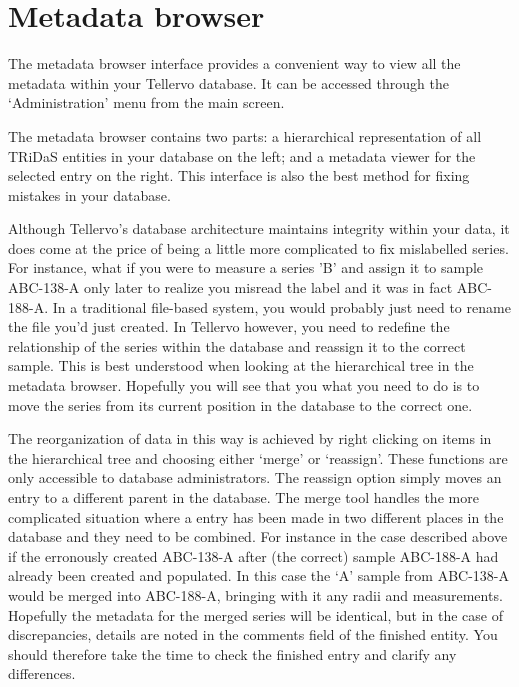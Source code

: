 \section{Metadata browser}
The metadata browser interface provides a convenient way to view all the metadata within your Tellervo database.  It can be accessed through the `Administration' menu from the main screen.

The metadata browser contains two parts: a hierarchical representation of all TRiDaS entities in your database on the left; and a metadata viewer for the selected entry on the right.  This interface is also the best method for fixing mistakes in your database.

Although Tellervo's database architecture maintains integrity within your data, it does come at the price of being a little more complicated to fix mislabelled series.  For instance, what if you were to measure a series 'B' and assign it to sample ABC-138-A only later to realize you misread the label and it was in fact ABC-188-A.  In a traditional file-based system, you would probably just need to rename the file you'd just created.  In Tellervo however, you need to redefine the relationship of the series within the database and reassign it to the correct sample.  This is best understood when looking at the hierarchical tree in the metadata browser.  Hopefully you will see that you what you need to do is to move the series from its current position in the database to the correct one.  

The reorganization of data in this way is achieved by right clicking on items in the hierarchical tree and choosing either `merge' or `reassign'.  These functions are only accessible to database administrators.  The reassign option simply moves an entry to a different parent in the database.  The merge tool handles the more complicated situation where a entry has been made in two different places in the database and they need to be combined.  For instance in the case described above if the erronously created ABC-138-A after (the correct) sample  ABC-188-A had already been created and populated.  In this case the `A' sample from ABC-138-A would be merged into ABC-188-A, bringing with it any radii and measurements.  Hopefully the metadata for the merged series will be identical, but in the case of discrepancies, details are noted in the comments field of the finished entity.  You should therefore take the time to check the finished entry and clarify any differences.

